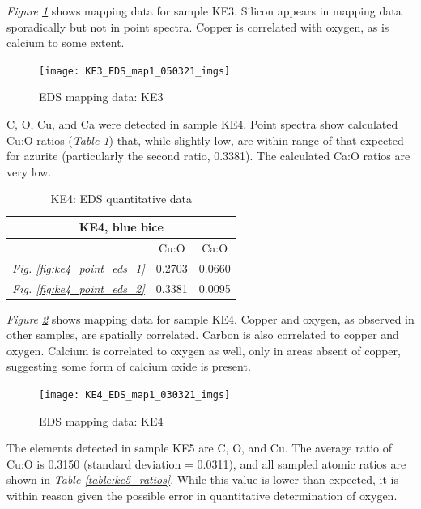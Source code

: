 \textit{Figure \ref{fig:ke3_map1}} shows mapping data for sample KE3. Silicon appears in mapping data sporadically but not in point spectra. Copper is correlated with oxygen, as is calcium to some extent.

\begin{figure}[H]
\centering
  \texttt{[image: KE3\_EDS\_map1\_050321\_imgs]}
\caption[EDS mapping data: KE3]{EDS mapping data: KE3}
\label{fig:ke3_map1}
\end{figure}


C, O, Cu, and Ca were detected in sample KE4. Point spectra show calculated Cu:O ratios (\textit{Table \ref{table:ke4_ratios}}) that, while slightly low, are within range of that expected for azurite (particularly the second ratio, 0.3381). The calculated Ca:O ratios are very low.

\begin{table}[H]
\caption{KE4: EDS quantitative data}
\centering
\label{table:ke4_ratios}
\begin{tabular}{c c c}
\toprule
\multicolumn{3}{c}{KE4, blue bice} \\
\midrule
~ & Cu:O & Ca:O \\
\midrule
\textit{Fig. \ref{fig:ke4_point_eds_1}} & 0.2703 & 0.0660 \\
\textit{Fig. \ref{fig:ke4_point_eds_2}} & 0.3381 & 0.0095 \\
\bottomrule
\end{tabular}
\end{table}

\textit{Figure \ref{fig:ke4_map1}} shows mapping data for sample KE4. Copper and oxygen, as observed in other samples, are spatially correlated. Carbon is also correlated to copper and oxygen. Calcium is correlated to oxygen as well, only in areas absent of copper, suggesting some form of calcium oxide is present.

\begin{figure}[H]
\centering
  \texttt{[image: KE4\_EDS\_map1\_030321\_imgs]}
\caption[EDS mapping data: KE4]{EDS mapping data: KE4}
\label{fig:ke4_map1}
\end{figure}


The elements detected in sample KE5 are C, O, and Cu. The average ratio of Cu:O is 0.3150 (standard deviation = 0.0311), and all sampled atomic ratios are shown in \textit{Table \ref{table:ke5_ratios}}. While this value is lower than expected, it is within reason given the possible error in quantitative determination of oxygen.

